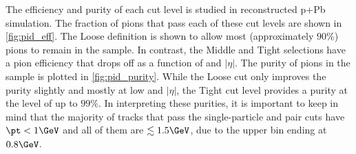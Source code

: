 The efficiency and purity of each cut level is studied in reconstructed p+Pb \Hijing simulation.
The fraction of pions that pass each of these cut levels are shown in \cref{fig:pid_eff}.
The Loose definition is shown to allow most (approximately $90\%$) pions to remain in the sample.
In contrast, the Middle and Tight selections have a pion efficiency that drops off as a function of \pt and $|\eta|$.
The purity of pions in the sample is plotted in \cref{fig:pid_purity}.
While the Loose cut only improves the purity slightly and mostly at low \pt and $|\eta|$, the Tight cut level provides a purity at the level of up to $99\%$.
In interpreting these purities, it is important to keep in mind that the majority of tracks that pass the single-particle and pair cuts have $\pt < 1 \GeV$ and all of them are $\lesssim 1.5 \GeV$, due to the upper \kt bin ending at $0.8 \GeV$.

